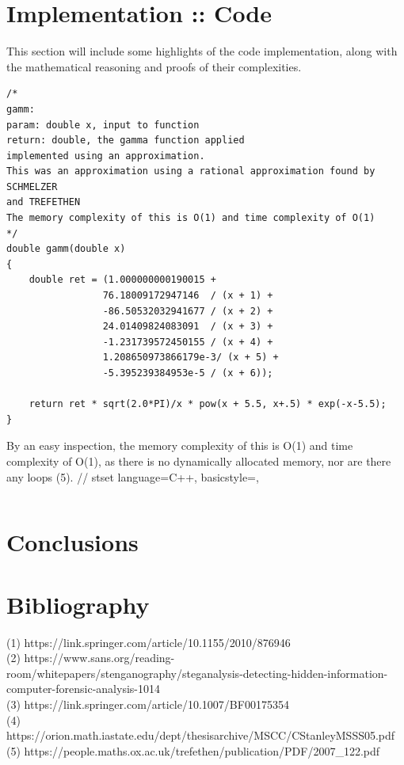 \documentclass[12pt]{article}
\begin{document}
\section{Implementation :: Code}
This section will include some highlights of the code implementation, along with the mathematical reasoning and proofs of their complexities.
\lstset { 
    language=C++,
    basicstyle=\footnotesize,
}
\begin{lstlisting}
/*
gamm:
param: double x, input to function
return: double, the gamma function applied
implemented using an approximation.
This was an approximation using a rational approximation found by SCHMELZER
and TREFETHEN
The memory complexity of this is O(1) and time complexity of O(1)
*/
double gamm(double x) 
{
    double ret = (1.000000000190015 + 
                 76.18009172947146  / (x + 1) +  
                 -86.50532032941677 / (x + 2) + 
                 24.01409824083091  / (x + 3) +  
                 -1.231739572450155 / (x + 4) + 
                 1.208650973866179e-3/ (x + 5) + 
                 -5.395239384953e-5 / (x + 6));
    
    return ret * sqrt(2.0*PI)/x * pow(x + 5.5, x+.5) * exp(-x-5.5);
}
\end{lstlisting}
By an easy inspection, the memory complexity of this is O(1) and time complexity of O(1), as there is no dynamically allocated memory, nor are there any loops (5).
//
stset { 
    language=C++,
    basicstyle=\footnotesize,
}
\begin{lstlisting}

\end{lstlisting}


\section{Conclusions}

\section{Bibliography}
(1) https://link.springer.com/article/10.1155/2010/876946 \\
(2) https://www.sans.org/reading-room/whitepapers/stenganography/steganalysis-detecting-hidden-information-computer-forensic-analysis-1014 \\
(3) https://link.springer.com/article/10.1007/BF00175354 \\
(4) https://orion.math.iastate.edu/dept/thesisarchive/MSCC/CStanleyMSSS05.pdf \\
(5) https://people.maths.ox.ac.uk/trefethen/publication/PDF/2007\_122.pdf
\end{document}
